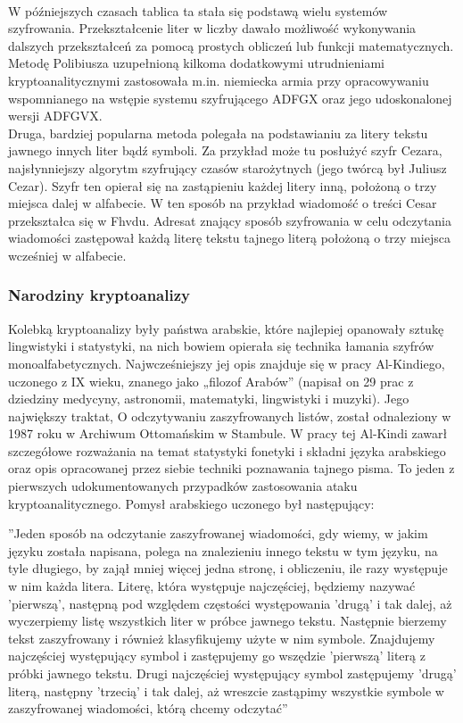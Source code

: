 \documentclass[10pt, letterpaper, titlepage]{article}
\begin{document}
\\
W późniejszych czasach tablica ta stała się podstawą wielu systemów szyfrowania. Przekształcenie
liter w liczby dawało możliwość wykonywania dalszych przekształceń za pomocą prostych obliczeń
lub funkcji matematycznych. Metodę Polibiusza uzupełnioną kilkoma dodatkowymi utrudnieniami
kryptoanalitycznymi zastosowała m.in. niemiecka armia przy opracowywaniu wspomnianego na
wstępie systemu szyfrującego ADFGX oraz jego udoskonalonej wersji ADFGVX.\\
Druga, bardziej popularna metoda polegała na podstawianiu za litery tekstu jawnego innych liter
bądź symboli. Za przykład może tu posłużyć szyfr Cezara, najsłynniejszy algorytm szyfrujący czasów starożytnych (jego twórcą był Juliusz Cezar). Szyfr ten opierał się na zastąpieniu każdej
litery inną, położoną o trzy miejsca dalej w alfabecie. W ten sposób na przykład wiadomość o treści
Cesar przekształca się w Fhvdu. Adresat znający sposób szyfrowania w celu odczytania wiadomości
zastępował każdą literę tekstu tajnego literą położoną o trzy miejsca wcześniej w alfabecie.
\subsubsection{Narodziny kryptoanalizy}
Kolebką kryptoanalizy były państwa arabskie, które najlepiej opanowały sztukę lingwistyki i statystyki, na nich bowiem opierała się technika łamania szyfrów monoalfabetycznych. Najwcześniejszy
jej opis znajduje się w pracy Al-Kindiego, uczonego z IX wieku, znanego jako „filozof Arabów”
(napisał on 29 prac z dziedziny medycyny, astronomii, matematyki, lingwistyki i muzyki). Jego
największy traktat, O odczytywaniu zaszyfrowanych listów, został odnaleziony w 1987 roku w Archiwum Ottomańskim w Stambule. W pracy tej Al-Kindi zawarł szczegółowe rozważania na temat
statystyki fonetyki i składni języka arabskiego oraz opis opracowanej przez siebie techniki poznawania tajnego pisma. To jeden z pierwszych udokumentowanych przypadków zastosowania ataku
kryptoanalitycznego. Pomysł arabskiego uczonego był następujący:
\begin{center}
”Jeden sposób na odczytanie zaszyfrowanej wiadomości, gdy wiemy, w jakim języku została
napisana, polega na znalezieniu innego tekstu w tym języku, na tyle długiego, by zajął mniej
więcej jedna stronę, i obliczeniu, ile razy występuje w nim każda litera. Literę, która występuje
najczęściej, będziemy nazywać ’pierwszą’, następną pod względem częstości występowania ’drugą’
i tak dalej, aż wyczerpiemy listę wszystkich liter w próbce jawnego tekstu. Następnie bierzemy
tekst zaszyfrowany i również klasyfikujemy użyte w nim symbole. Znajdujemy najczęściej
występujący symbol i zastępujemy go wszędzie ’pierwszą’ literą z próbki jawnego tekstu. Drugi
najczęściej występujący symbol zastępujemy ’drugą’ literą, następny ’trzecią’ i tak dalej, aż
wreszcie zastąpimy wszystkie symbole w zaszyfrowanej wiadomości, którą chcemy odczytać”\cite{ texbook}
\end{center}
\end{document}

